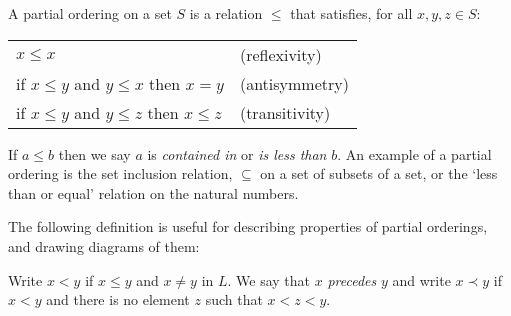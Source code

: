 \documentclass[12pt]{report}
\newenvironment{itemizes}{\vspace{0.1cm}}{\\}
\newcommand{\items}{\\ \vspace{0.1cm}\indent}
\begin{document}

\begin{defn}
A partial ordering on a set $S$ is a relation $\le$ that satisfies, for all $x,y,z \in S$:
\begin{center}
\begin{tabular}{ll}
$x \le x$ & (reflexivity)\\
if $x \le y$ and $y \le x$ then $x = y$ & (antisymmetry) \\
if $x \le y$ and $y \le z$ then $x \le z$ & (transitivity)
\end{tabular}
\end{center}
\end{defn}
If $a \le b$ then we say $a$ is \emph{contained in} or \emph{is less than} $b$. An example of a partial ordering is the set inclusion relation, $\subseteq$ on a set of subsets of a set, or the `less than or equal' relation on the natural numbers.

The following definition is useful for describing properties of partial orderings, and drawing diagrams of them:
\begin{defn}
    Write $x < y$ if $x \le y$ and $x \neq y$ in $L$. We say that $x$ 
    \emph{precedes} $y$ and write $x \prec y$ if $x < y$ and there is no 
    element $z$ such that $x < z < y$.
\end{defn}
\end{document}
